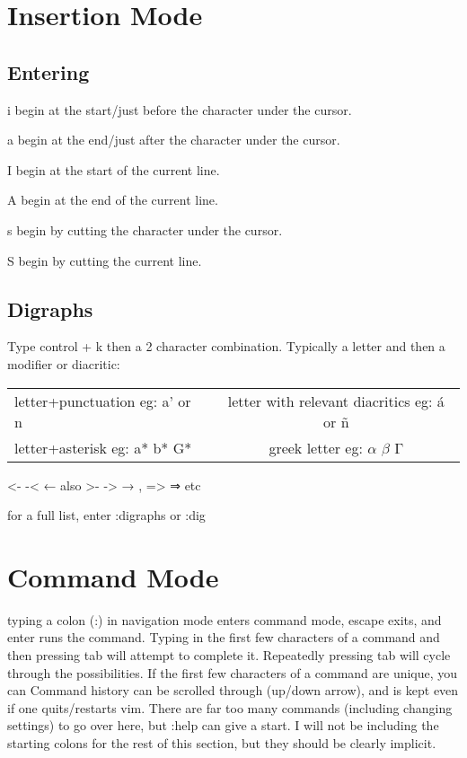 \documentclass[12pt]{article}
\begin{document}
\newpage
\section{Insertion Mode}
\subsection{Entering}
i begin at the start/just before the character under the cursor.

a begin at the end/just after the character under the cursor.

I begin at the start of the current line.

A begin at the end of the current line.

s begin by cutting the character under the cursor.

S begin by cutting the current line.

\subsection{Digraphs}
Type control + k then a 2 character combination. Typically a letter and then a modifier or diacritic:

\begin{tabular}{l | c}
letter+punctuation eg: a' or n~ & letter with relevant diacritics eg: á or ñ \\
letter+asterisk eg: a* b* G* & greek letter eg: $\alpha$ $\beta$ Γ \\ %
\end{tabular}
<- -< ← also >- -> → , => ⇒ etc

for a full list, enter :digraphs or :dig


\newpage
\section{Command Mode}
typing a colon (:) in navigation mode enters command mode, escape exits, and enter runs the command. Typing in the first few characters of a command and then pressing tab will attempt to complete it. Repeatedly pressing tab will cycle through the possibilities. If the first few characters of a command are unique, you can Command history can be scrolled through (up/down arrow), and is kept even if one quits/restarts vim. There are far too many commands (including changing settings) to go over here, but :help can give a start. I will not be including the starting colons for the rest of this section, but they should be clearly implicit.
\end{document}
